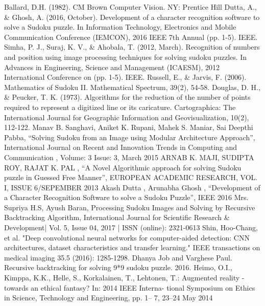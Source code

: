 \documentclass[conference]{IEEEtran}
\begin{document}
\begin{thebibliography}{00}
 Ballard, D.H. (1982). CM Brown Computer Vision. NY: Prentice Hill
 Dutta, A., \& Ghosh, A. (2016, October). Development of a character recognition software to solve a Sudoku puzzle. In Information Technology, Electronics and Mobile Communication Conference (IEMCON), 2016 IEEE 7th Annual (pp. 1-5). IEEE.
 Simha, P. J., Suraj, K. V., \& Ahobala, T. (2012, March). Recognition of numbers and position using image processing techniques for solving sudoku puzzles. In Advances in Engineering, Science and Management (ICAESM), 2012 International Conference on (pp. 1-5). IEEE.
 Russell, E., \& Jarvis, F. (2006). Mathematics of Sudoku II. Mathematical Spectrum, 39(2), 54-58.
 Douglas, D. H., \& Peucker, T. K. (1973). Algorithms for the reduction of the number of points required to represent a digitized line or its caricature. Cartographica: The International Journal for Geographic Information and Geovisualization, 10(2), 112-122.
 Manav B. Sanghavi, Aniket K. Rupani, Mahek S. Maniar, Sai Deepthi Pabba, “Solving Sudoku from an Image using Modular Architecture Approach”, International Journal on Recent and Innovation Trends in Computing and Communication , Volume: 3 Issue: 3, March 2015
 ARNAB K. MAJI, SUDIPTA ROY, RAJAT K. PAL , “A Novel Algorithmic approach for solving Sudoku puzzle in Guessed Free Manner”, EUROPEAN ACADEMIC RESEARCH, VOL. I, ISSUE 6/SEPEMBER 2013
 Akash Dutta , Arunabha Ghosh , “Development of a Character Recognition Software to solve a Sudoku Puzzle”, IEEE 2016
 Mrs. Supriya H.S, Ayush Baran, Processing Sudoku Images and Solving
by Recursive Backtracking Algorithm, International Journal for
Scientific Research \& Development| Vol. 5, Issue 04, 2017 | ISSN
(online): 2321-0613
 Shin, Hoo-Chang, et al. "Deep convolutional neural networks for
computer-aided detection: CNN architectures, dataset characteristics and
transfer learning." IEEE transactions on medical imaging 35.5 (2016):
1285-1298.
 Dhanya Job and Varghese Paul. Recursive backtracking for solving 9*9
sudoku puzzle. 2016.
 Heimo, O.I., Kimppa, K.K., Helle, S., Korkalainen, T., Lehtonen, T.:
Augmented reality - towards an ethical fantasy? In: 2014 IEEE Interna-
tional Symposium on Ethics in Science, Technology and Engineering,
pp. 1– 7, 23–24 May 2014
\end{thebibliography}
\end{document}
